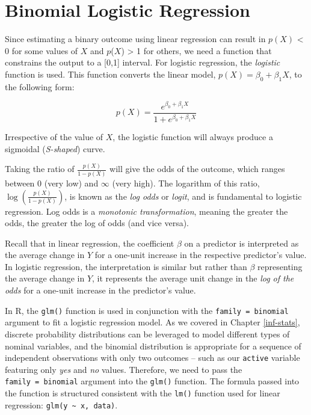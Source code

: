\documentclass[
]{book}
\begin{document}
\hypertarget{binomial-logistic-regression}{%
\section{Binomial Logistic Regression}\label{binomial-logistic-regression}}

Since estimating a binary outcome using linear regression can result in \(p(X)\) \textless{} 0 for some values of \(X\) and \(p\)(\(X\)) \textgreater{} 1 for others, we need a function that constrains the output to a {[}0,1{]} interval. For logistic regression, the \emph{logistic} function is used. This function converts the linear model, \(p(X) = \beta_0 + \beta_1 X\), to the following form:

\[ p(X) = \frac{e^{\beta_0 + \beta_1 X}}{1+e^{\beta_0 + \beta_1 X}} \]

Irrespective of the value of \(X\), the logistic function will always produce a sigmoidal (\emph{S-shaped}) curve.

Taking the ratio of \(\frac {p(X)}{1 - p(X)}\) will give the odds of the outcome, which ranges between 0 (very low) and \(\infty\) (very high). The logarithm of this ratio, \(\log(\frac {p(X)}{1 - p(X)})\), is known as the \emph{log odds} or \emph{logit}, and is fundamental to logistic regression. Log odds is a \emph{monotonic transformation}, meaning the greater the odds, the greater the log of odds (and vice versa).

Recall that in linear regression, the coefficient \(\beta\) on a predictor is interpreted as the average change in \(Y\) for a one-unit increase in the respective predictor's value. In logistic regression, the interpretation is similar but rather than \(\beta\) representing the average change in \(Y\), it represents the average unit change in the \emph{log of the odds} for a one-unit increase in the predictor's value.

In R, the \texttt{glm()} function is used in conjunction with the \texttt{family\ =\ binomial} argument to fit a logistic regression model. As we covered in Chapter \ref{inf-stats}, discrete probability distributions can be leveraged to model different types of nominal variables, and the binomial distribution is appropriate for a sequence of independent observations with only two outcomes -- such as our \texttt{active} variable featuring only \emph{yes} and \emph{no} values. Therefore, we need to pass the \texttt{family\ =\ binomial} argument into the \texttt{glm()} function. The formula passed into the function is structured consistent with the \texttt{lm()} function used for linear regression: \texttt{glm(y\ \textasciitilde{}\ x,\ data)}.
\end{document}
